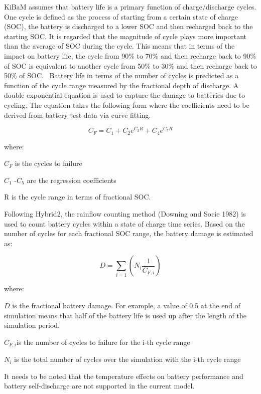 KiBaM assumes that battery life is a primary function of charge/discharge cycles. One cycle is defined as the process of starting from a certain state of charge (SOC), the battery is discharged to a lower SOC and then recharged back to the starting SOC. It is regarded that the magnitude of cycle plays more important than the average of SOC during the cycle. This means that in terms of the impact on battery life, the cycle from 90\% to 70\% and then recharge back to 90\% of SOC is equivalent to another cycle from 50\% to 30\% and then recharge back to 50\% of SOC.~ Battery life in terms of the number of cycles is predicted as a function of the cycle range measured by the fractional depth of discharge. A double exponential equation is used to capture the damage to batteries due to cycling. The equation takes the following form where the coefficients need to be derived from battery test data via curve fitting.

\begin{equation}
{C_F} = {C_1} + {C_2}{e^{{C_3}R}} + {C_4}{e^{{C_5}R}}
\end{equation}

where:

\({C_F}\) is the cycles to failure

\({C_1}\) -\({C_5}\) are the regression coefficients

R is the cycle range in terms of fractional SOC.

Following Hybrid2, the rainflow counting method (Downing and Socie 1982) is used to count battery cycles within a state of charge time series. Based on the number of cycles for each fractional SOC range, the battery damage is estimated as:

\begin{equation}
D = \sum\limits_{i = 1}^{} {\left( {{N_i}\frac{1}{{{C_{F,i}}}}} \right)}
\end{equation}

where:

\(D\) is the fractional battery damage. For example, a value of 0.5 at the end of simulation means that half of the battery life is used up after the length of the simulation period.

\({C_{F,i}}\)is the number of cycles to failure for the i-th cycle range

\({N_i}\) is the total number of cycles over the simulation with the i-th cycle range

It needs to be noted that the temperature effects on battery performance and battery self-discharge are not supported in the current model.

